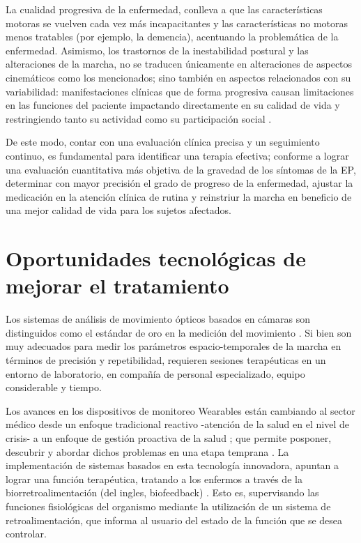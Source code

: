 La cualidad progresiva de la enfermedad, conlleva a que las características motoras se vuelven cada vez más incapacitantes y las características no motoras menos tratables (por ejemplo, la demencia), acentuando la problemática de la enfermedad. Asimismo, los trastornos de la inestabilidad postural y las alteraciones de la marcha, no se traducen únicamente en alteraciones de aspectos cinemáticos como los mencionados; sino también en aspectos relacionados con su variabilidad: manifestaciones clínicas que de forma progresiva causan limitaciones en las funciones del paciente impactando directamente en su calidad de vida y restringiendo tanto su actividad como su participación social \cite{DILLMANN2014882,MUNOZHELLIN2013190,FernandezDelOlmo2004,GOMEZGONZALEZ2019396}.

De este modo, contar con una evaluación clínica precisa y un seguimiento continuo, es fundamental para identificar una terapia efectiva; conforme a lograr una evaluación cuantitativa más objetiva de la gravedad de los síntomas de la EP, determinar con mayor precisión el grado de progreso de la enfermedad, ajustar la medicación en la atención clínica de rutina y reinstriur la marcha en beneficio de una mejor calidad de vida para los sujetos afectados.
 
\section{Oportunidades tecnológicas de mejorar el tratamiento}

Los sistemas de análisis de movimiento ópticos basados en cámaras son distinguidos como el estándar de oro en la medición del movimiento \cite{Stamatakis}. Si bien son muy adecuados para medir los parámetros espacio-temporales de la marcha en términos de precisión y repetibilidad, requieren sesiones terapéuticas en un entorno de laboratorio, en compañía de personal especializado, equipo considerable y tiempo.

Los avances en los dispositivos de monitoreo \gls{Wearables} están cambiando al sector médico desde un enfoque tradicional reactivo -atención de la salud en el nivel de crisis- a un enfoque de gestión proactiva de la salud \cite{SIMIC,SEPEPE,Galnares,Olivares}; que permite posponer, descubrir y abordar dichos problemas en una etapa temprana \cite{Guo}. La implementación de sistemas basados en esta tecnología innovadora, apuntan a lograr una función terapéutica, tratando a los enfermos a través de la biorretroalimentación (del ingles, \gls{biofeedback}) \cite{Frank2010} \cite{Nonnekes,Ginis2016,Lopez2014,Rochester2010}. Esto es, supervisando las funciones fisiológicas del organismo mediante la utilización de un sistema de retroalimentación, que informa al usuario del estado de la función que se desea controlar.

